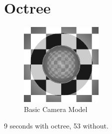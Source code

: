 \documentclass{article}
\begin{document}
\section{Octree}

\begin{figure}[H]
  \begin{center}
  \includegraphics[width=150px]{Images/octreeTest.png}
  \caption{Basic Camera Model}
  \label{fig:basiccammod}
  \end{center}
\end{figure}

9 seconds with octree, 53 without.



\end{document}
